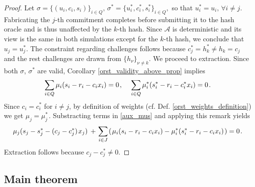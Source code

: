 \documentclass{iacrtrans}
\begin{document}
\begin{proof}
Let $\sigma = \{(u_i, c_i, s_i)\}_{i \in Q},\hspace{2pt}
\sigma^* = \{u_i^*, c_i^*, s_i^*\}_{i \in Q},$ so that
$u_i^* = u_i,\hspace{2pt}\forall i \neq j$.
Fabricating the $j$-th commitment completes
before submitting it to the hash oracle
and is thus unaffected by the $k$-th hash.
Since $\mathcal{A}$ is deterministic and its view is
the same in both simulations except for the $k$-th hash,
we conclude that $u_j = u_j^*$.
The constraint regarding challenges follows because
$c_j^* = h_k^* \neq h_k = c_j$
and the rest challenges are drawn from $\{h_\nu\}_{\nu \neq k}$.
We proceed to extraction.
Since both $\sigma$, $\sigma^*$ are valid, Corollary
\ref{orst_validity_above_prop} implies
\vspace{5pt}
\begin{equation}\label{aux_mus}
\sum_{i \in Q} \mu_i (s_i - r_i - c_i x_i) = 0\hspace{1pt},
\hspace{12pt}
\sum_{i \in Q} \mu_i^* (s_i^* - r_i - c_i^* x_i) = 0\hspace{1pt}.
\vspace{5pt}
\end{equation}
\noindent
Since $c_i = c^*_i$ for $i \neq j$,
by definition of weights (cf. Def. \ref{orst_weights_definition}) we get
$\mu_j = \mu^*_j\hspace{1pt}$.
Substracting terms in \eqref{aux_mus} and applying this remark yields
\vspace{5pt}
\begin{equation*}
\mu_j (s_j - s_j^* - (c_j - c_j^*)\hspace{1pt} x_j)
\hspace{2pt}
+
\hspace{1pt}
\sum_{i \in J}\hspace{1pt}
(
\hspace{1pt}
\mu_i (s_i - r_i - c_i x_i)
-
\mu_i^* (s_i^* - r_i - c_i x_i)
\hspace{1pt}
)
=
0\hspace{1pt}.
\vspace{5pt}
\end{equation*}
Extraction follows because $c_j - c_j^* \neq 0$.
\vspace{0pt}
\end{proof}

\subsection{Main theorem}\label{section_main_theorem}
\end{document}
